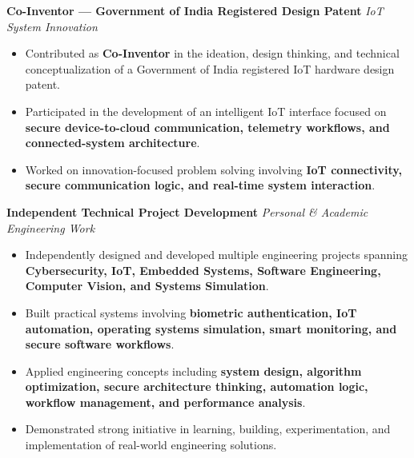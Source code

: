 \documentclass[a4paper,11pt]{article}
\begin{document}
\vspace{6pt}

\textbf{Co-Inventor --- Government of India Registered Design Patent}
\hfill \textit{IoT System Innovation}

\begin{itemize}

    \item Contributed as \textbf{Co-Inventor} in the ideation, design thinking, and technical conceptualization of a Government of India registered IoT hardware design patent.

    \item Participated in the development of an intelligent IoT interface focused on \textbf{secure device-to-cloud communication, telemetry workflows, and connected-system architecture}.

    \item Worked on innovation-focused problem solving involving \textbf{IoT connectivity, secure communication logic, and real-time system interaction}.

\end{itemize}

\vspace{6pt}

\textbf{Independent Technical Project Development}
\hfill \textit{Personal \& Academic Engineering Work}

\begin{itemize}

    \item Independently designed and developed multiple engineering projects spanning \textbf{Cybersecurity, IoT, Embedded Systems, Software Engineering, Computer Vision, and Systems Simulation}.

    \item Built practical systems involving \textbf{biometric authentication, IoT automation, operating systems simulation, smart monitoring, and secure software workflows}.

    \item Applied engineering concepts including \textbf{system design, algorithm optimization, secure architecture thinking, automation logic, workflow management, and performance analysis}.

    \item Demonstrated strong initiative in learning, building, experimentation, and implementation of real-world engineering solutions.

\end{itemize}
\end{document}
